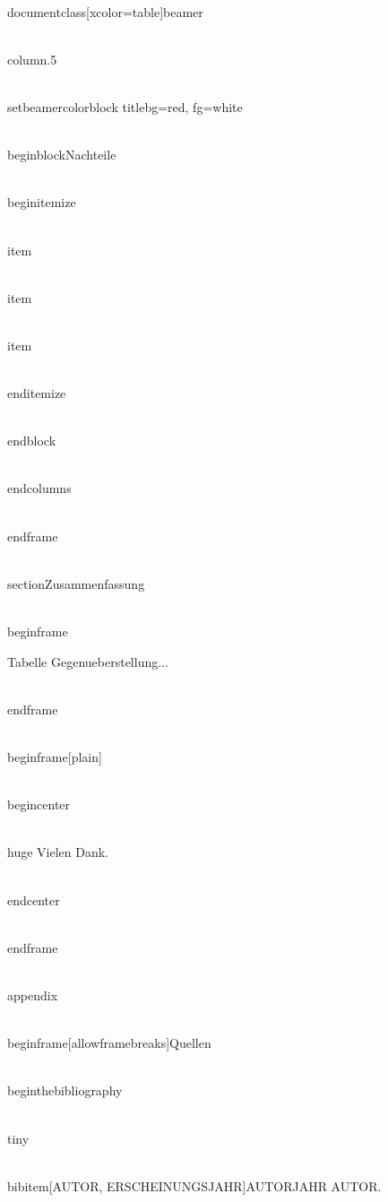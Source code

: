 \\documentclass[xcolor=table]{beamer}
\begin{document}
        \\column{.5\textwidth}

{
        \\setbeamercolor{block title}{bg=red, fg=white}

        \\begin{block}{Nachteile}

            \\begin{itemize}

                \\item

                \\item

                \\item 

            \\end{itemize}

        \\end{block}	
}

    \\end{columns}		

\\end{frame}  


\\section{Zusammenfassung}

\\begin{frame}{\secname}

    Tabelle Gegenueberstellung...

\\end{frame}


\\begin{frame}[plain]

    \\begin{center}
    
    \\huge Vielen Dank.

    \\end{center}

\\end{frame}


\\appendix

\\begin{frame}[allowframebreaks]{Quellen}

    \\begin{thebibliography}{AUTOR, ERSCHEINUNGSJAHR}

    \\tiny

        \\bibitem[AUTOR, ERSCHEINUNGSJAHR]{AUTORJAHR}
            AUTOR.
\end{document}
